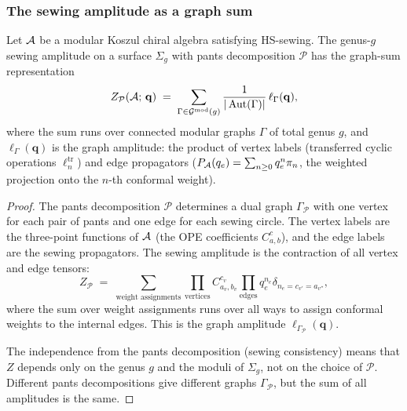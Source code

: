 \subsubsection{The sewing amplitude as a graph sum}

\begin{proposition}
Let $\mathcal{A}$ be a modular Koszul chiral algebra satisfying HS-sewing. The genus-$g$ sewing amplitude on a surface $\Sigma_g$ with pants decomposition $\mathcal{P}$ has the graph-sum representation
\begin{equation}%
Z_{\mathcal{P}}(\cA;\,\mathbf{q}) \;=\; \sum_{\Gamma \in \Gmod(g)} \frac{1}{|\Aut(\Gamma)|}\,\ell_\Gamma(\mathbf{q}),
\end{equation}
where the sum runs over connected modular graphs $\Gamma$ of total genus $g$, and $\ell_\Gamma(\mathbf{q})$ is the graph amplitude: the product of vertex labels (transferred cyclic operations $\ell_n^{\mathrm{tr}}$) and edge propagators ($P_{\mathcal{A}}(q_e) = \sum_{n \geq 0} q_e^n \pi_n$, the weighted projection onto the $n$-th conformal weight).
\end{proposition}

\begin{proof}
The pants decomposition $\mathcal{P}$ determines a dual graph $\Gamma_\mathcal{P}$ with one vertex for each pair of pants and one edge for each sewing circle. The vertex labels are the three-point functions of $\mathcal{A}$ (the OPE coefficients $C^c_{a,b}$), and the edge labels are the sewing propagators. The sewing amplitude is the contraction of all vertex and edge tensors:
\[
Z_{\mathcal{P}} \;=\; \sum_{\text{weight assignments}} \prod_{\text{vertices}} C^{c_v}_{a_v,b_v} \prod_{\text{edges}} q_e^{n_e} \delta_{n_e = c_{v'} = a_{v''}},
\]
where the sum over weight assignments runs over all ways to assign conformal weights to the internal edges. This is the graph amplitude $\ell_{\Gamma_\mathcal{P}}(\mathbf{q})$.

The independence from the pants decomposition (sewing consistency) means that $Z$ depends only on the genus $g$ and the moduli of $\Sigma_g$, not on the choice of $\mathcal{P}$. Different pants decompositions give different graphs $\Gamma_\mathcal{P}$, but the sum of all amplitudes is the same.
\end{proof}

